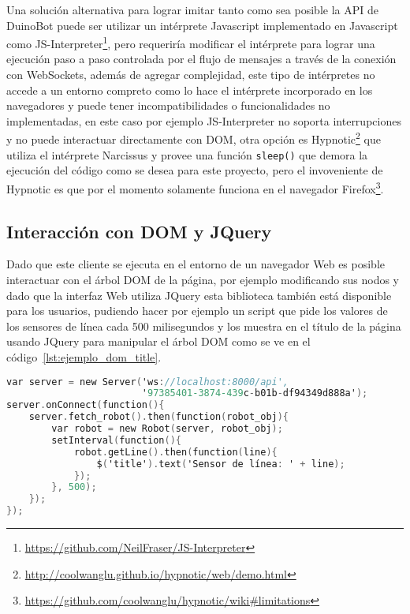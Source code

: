 Una solución alternativa para lograr imitar tanto como sea posible la
API de DuinoBot puede ser utilizar un intérprete Javascript implementado en
Javascript como
JS-Interpreter\footnote{\url{https://github.com/NeilFraser/JS-Interpreter}},
pero requeriría modificar el intérprete para lograr una ejecución paso a paso
controlada por el flujo de mensajes a través de la conexión con WebSockets,
además de agregar complejidad, este tipo de intérpretes no accede a un entorno
compreto como lo hace el intérprete incorporado en los navegadores y puede
tener incompatibilidades o funcionalidades no implementadas, en este caso
por ejemplo JS-Interpreter no soporta interrupciones y no puede interactuar
directamente con DOM, otra opción es
Hypnotic\footnote{\url{http://coolwanglu.github.io/hypnotic/web/demo.html}}
que utiliza el intérprete Narcissus y provee una función \texttt{sleep()} que
demora la ejecución del código como se desea para este proyecto, pero el
invoveniente de Hypnotic es que por el momento solamente funciona en el
navegador
Firefox\footnote{\url{https://github.com/coolwanglu/hypnotic/wiki\#limitations}}.


\subsection{Interacción con DOM y JQuery}

Dado que este cliente se ejecuta en el entorno de un navegador Web es posible
interactuar con el árbol DOM de la página, por ejemplo modificando sus nodos y
dado que la interfaz Web utiliza JQuery esta biblioteca también está disponible
para los usuarios, pudiendo hacer por ejemplo un script que pide los valores
de los sensores de línea cada 500 milisegundos y los muestra en el título de la
página usando JQuery para manipular el árbol DOM como se ve en el
 código~\ref{lst:ejemplo_dom_title}.

\begin{lstlisting}[language=C,
caption={Manipulación de DOM con JQuery desde
XRemoteBot para Javascript},
label={lst:ejemplo_dom_title}]
var server = new Server('ws://localhost:8000/api',
                        '97385401-3874-439c-b01b-df94349d888a');
server.onConnect(function(){
    server.fetch_robot().then(function(robot_obj){
        var robot = new Robot(server, robot_obj);
        setInterval(function(){
            robot.getLine().then(function(line){
                $('title').text('Sensor de línea: ' + line);
            });
        }, 500);
    });
});
\end{lstlisting}


